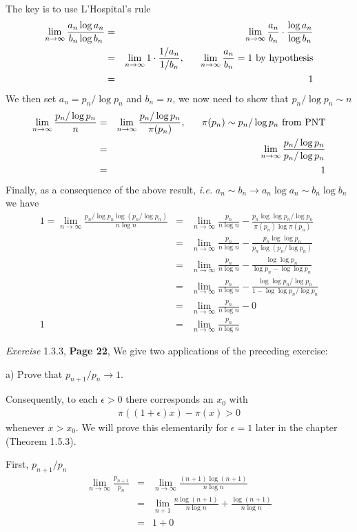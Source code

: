 \documentclass[aps,preprint,preprintnumbers,nofootinbib,showpacs,prd]{revtex4-1}
\newcommand{\ie}{{\it i.e.} }
\newcommand{\nbea}{\begin{eqnarray*}}
\newcommand{\neea}{\end{eqnarray*}}
\begin{document}
The key is to use L'Hospital's rule
%
\nbea
\lim_{n\to\infty} \frac{a_n\log a_n}{b_n\log b_n} & = & \lim_{n\to\infty} \frac{a_n}{b_n} \cdot \frac{\log a_n}{\log b_n} \\
& = & \lim_{n\to\infty} 1 \cdot \frac{1/a_n}{1/b_n}, ~~~~~  \lim_{n\to\infty} \frac{a_n}{b_n} = 1 {\rm~by~hypothesis}\\
& = & 1
\neea
%
We then set $a_n = p_n/\log p_n$ and $b_n = n$, we now need to show that $p_n/\log p_n \sim n$
%
\nbea
\lim_{n\to\infty}\frac{p_n/\log p_n}{n} & = & \lim_{n\to\infty}\frac{p_n/\log p_n}{\pi(p_n)}, ~~~~~ \pi(p_n) \sim p_n/\log p_n {\rm~from~PNT} \\
& = & \lim_{n\to\infty}\frac{p_n/\log p_n}{p_n/\log p_n} \\
& = & 1
\neea
%
Finally, as a consequence of the above result, \ie $a_n \sim b_n \to a_n\log a_n \sim b_n \log b_n$ we have
%
\nbea
1 = \lim_{n\to\infty}\frac{p_n/\log p_n\log(p_n/\log p_n)}{n\log n} & = & \lim_{n\to\infty}\frac{p_n}{n\log n} - \frac{p_n\log\log p_n/\log p_n}{\pi(p_n)\log \pi(p_n)} \\
& = & \lim_{n\to\infty}\frac{p_n}{n\log n} - \frac{p_n \log \log p_n}{p_n \log (p_n/\log p_n)} \\
& = & \lim_{n\to\infty}\frac{p_n}{n\log n} - \frac{\log \log p_n}{\log p_n - \log \log p_n} \\
& = & \lim_{n\to\infty}\frac{p_n}{n\log n} - \frac{\log \log p_n/\log p_n}{1 - \log \log p_n/\log p_n} \\
& = & \lim_{n\to\infty}\frac{p_n}{n\log n} - 0 \\
1 & = & \lim_{n\to\infty}\frac{p_n}{n\log n}
\neea
%

{\it Exercise} 1.3.3, {\bf Page 22}, We give two applications of the preceding exercise:

a) Prove that $p_{n+1} /p_n \to 1$.

Consequently, to each $\epsilon > 0$ there corresponds an $x_0$ with 
%
\nbea
\pi((1 + \epsilon)x) − \pi(x) > 0
\neea
%
whenever $x > x_0$. We will prove this elementarily for $\epsilon = 1$ later in the chapter (Theorem 1.5.3).

First, $p_{n+1}/p_n$
%
\nbea
\lim_{n\to\infty} \frac{p_{n+1}}{p_n} & = & \lim_{n\to\infty} \frac{(n+1)\log(n+1)}{n\log n} \\
& = & \lim_{n+1} \frac{n\log(n+1)}{n\log n} + \frac{\log(n+1)}{n\log n} \\
& = & 1 + 0
\neea
%
\end{document}
